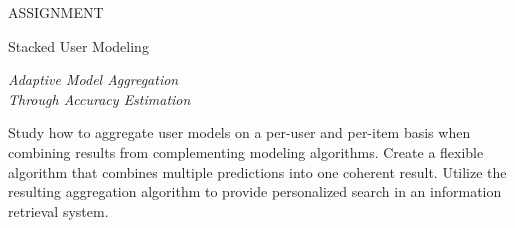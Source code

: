 \null\vspace{6em}

{
  \centering
  \color{gray}
  ASSIGNMENT
  \color{black}
  \vspace{1em}
  
  \LARGE{Stacked User Modeling}\\
  \vspace{1em}
  
  \itshape
  \large{Adaptive Model Aggregation}\\
  \large{Through Accuracy Estimation}\\
}

\vspace{3em}

Study how to aggregate user models on a per-user and per-item
basis when combining results from complementing modeling algorithms.
Create a flexible algorithm that combines multiple predictions
into one coherent result.
Utilize the resulting aggregation algorithm
to provide personalized search in an information retrieval system.

\vfill

